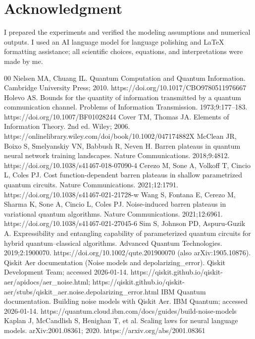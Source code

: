 \documentclass[journal]{IEEEtran}
\begin{document}
\section*{Acknowledgment}
I prepared the experiments and verified the modeling assumptions and numerical outputs. I used an AI language model for language polishing and \LaTeX{} formatting assistance; all scientific choices, equations, and interpretations were made by me.

\FloatBarrier
\begin{thebibliography}{00}
 Nielsen MA, Chuang IL. Quantum Computation and Quantum Information. Cambridge University Press; 2010. https://doi.org/10.1017/CBO9780511976667
 Holevo AS. Bounds for the quantity of information transmitted by a quantum communication channel. Problems of Information Transmission. 1973;9:177--183. https://doi.org/10.1007/BF01028244
 Cover TM, Thomas JA. Elements of Information Theory. 2nd ed. Wiley; 2006. https://onlinelibrary.wiley.com/doi/book/10.1002/047174882X
 McClean JR, Boixo S, Smelyanskiy VN, Babbush R, Neven H. Barren plateaus in quantum neural network training landscapes. Nature Communications. 2018;9:4812. https://doi.org/10.1038/s41467-018-07090-4
 Cerezo M, Sone A, Volkoff T, Cincio L, Coles PJ. Cost function-dependent barren plateaus in shallow parametrized quantum circuits. Nature Communications. 2021;12:1791. https://doi.org/10.1038/s41467-021-21728-w
 Wang S, Fontana E, Cerezo M, Sharma K, Sone A, Cincio L, Coles PJ. Noise-induced barren plateaus in variational quantum algorithms. Nature Communications. 2021;12:6961. https://doi.org/10.1038/s41467-021-27045-6
 Sim S, Johnson PD, Aspuru-Guzik A. Expressibility and entangling capability of parameterized quantum circuits for hybrid quantum--classical algorithms. Advanced Quantum Technologies. 2019;2:1900070. https://doi.org/10.1002/qute.201900070 (also arXiv:1905.10876).
 Qiskit Aer documentation (Noise models and depolarizing\_error). Qiskit Development Team; accessed 2026-01-14. https://qiskit.github.io/qiskit-aer/apidocs/aer\_noise.html; https://qiskit.github.io/qiskit-aer/stubs/qiskit\_aer.noise.depolarizing\_error.html
 IBM Quantum documentation. Building noise models with Qiskit Aer. IBM Quantum; accessed 2026-01-14. https://quantum.cloud.ibm.com/docs/guides/build-noise-models
 Kaplan J, McCandlish S, Henighan T, et al. Scaling laws for neural language models. arXiv:2001.08361; 2020. https://arxiv.org/abs/2001.08361

\end{thebibliography}
\end{document}
